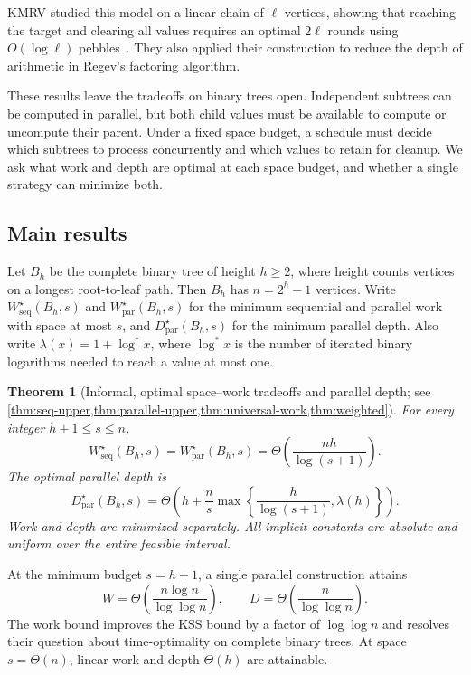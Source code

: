 \documentclass[11pt]{article}
\newtheorem{theorem}{Theorem}[section]
\theoremstyle{definition}
\theoremstyle{remark}
\newcommand{\Wseq}{W_{\mathrm{seq}}}
\newcommand{\Wpar}{W_{\mathrm{par}}}
\newcommand{\Dpar}{D_{\mathrm{par}}}
\begin{document}
KMRV studied this model on a linear chain of $\ell$ vertices, showing that reaching the target and clearing all values requires an optimal $2\ell$ rounds using $O(\log\ell)$ pebbles~\cite{KMRV2026}. They also applied their construction to reduce the depth of arithmetic in Regev's factoring algorithm.

These results leave the tradeoffs on binary trees open. Independent subtrees can be computed in parallel, but both child values must be available to compute or uncompute their parent. Under a fixed space budget, a schedule must decide which subtrees to process concurrently and which values to retain for cleanup. We ask what work and depth are optimal at each space budget, and whether a single strategy can minimize both.

\subsection{Main results}

Let $B_h$ be the complete binary tree of height $h\ge2$, where height counts vertices on a longest root-to-leaf path. Then $B_h$ has $n=2^h-1$ vertices. Write $\Wseq^\star(B_h,s)$ and $\Wpar^\star(B_h,s)$ for the minimum sequential and parallel work with space at most $s$, and $\Dpar^\star(B_h,s)$ for the minimum parallel depth. Also write $\lambda(x)=1+\log^*x$, where $\log^*x$ is the number of iterated binary logarithms needed to reach a value at most one.

\begin{theorem}[Informal, optimal space--work tradeoffs and parallel depth;
see \cref{thm:seq-upper,thm:parallel-upper,thm:universal-work,thm:weighted}]
\label{thm:main}
For every integer $h+1\le s\le n$,
\begin{equation}
    \Wseq^\star(B_h,s)=\Wpar^\star(B_h,s)=\Theta\!\left(\frac{nh}{\log(s+1)}\right).
    \label{eq:main-work}
\end{equation}
The optimal parallel depth is
\begin{equation}
    \Dpar^\star(B_h,s)=\Theta\!\left(h+\frac ns\max\!\left\{\frac{h}{\log(s+1)},\lambda(h)\right\}\right).
    \label{eq:main-depth}
\end{equation}
Work and depth are minimized separately. All implicit constants are absolute and uniform over the entire feasible interval.
\end{theorem}


At the minimum budget $s=h+1$, a single parallel construction attains
\begin{equation}
    W=\Theta\!\left(\frac{n\log n}{\log\log n}\right), \qquad D=\Theta\!\left(\frac n{\log\log n}\right).
    \label{eq:min-space}
\end{equation}
The work bound improves the KSS bound by a factor of $\log\log n$ and resolves their question about time-optimality on complete binary trees. At space $s=\Theta(n)$, linear work and depth $\Theta(h)$ are attainable.
\end{document}
